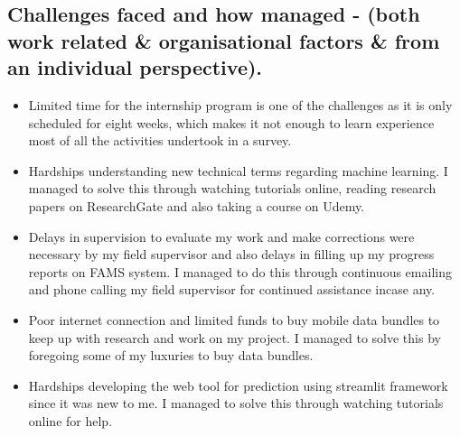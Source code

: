 \documentclass[11pt]{article}
\begin{document}
\subsection{Challenges faced and how managed - (both work related \& organisational factors \& from an
	individual perspective).}
\begin{itemize}
	\item Limited time for the internship program is one of the challenges as it is only scheduled for
	eight weeks, which makes it not enough to learn experience most of all the activities
	undertook in a survey.\\
	
	\item Hardships understanding new technical terms regarding machine  learning. I managed to solve this through watching tutorials online, reading research papers on ResearchGate and also taking a course on Udemy.\\ 
	
	\item Delays in supervision to evaluate my work and make corrections were necessary by my field supervisor and also delays in filling up my progress reports on FAMS system. I managed to do this through continuous emailing and phone calling my field supervisor for continued assistance incase any.\\
	
	\item Poor internet connection and limited funds to buy mobile data bundles to keep up with research and work on my project. I managed to solve this by foregoing some of my luxuries to buy data bundles.\\
	
	\item Hardships developing the web tool for prediction using streamlit framework since it was new to me. I managed to solve this through watching tutorials online for help.\\
	

	
\end{itemize}
\end{document}
